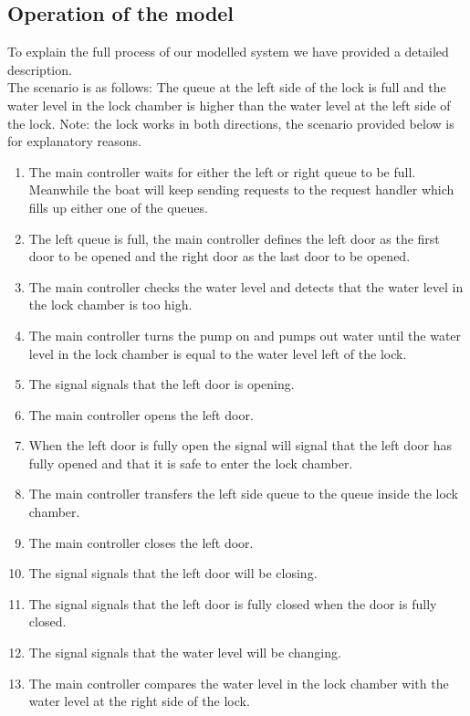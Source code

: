 \documentclass{article}
\begin{document}
    \subsection{Operation of the model}
        To explain the full process of our modelled system we have provided a detailed description. \\
        The scenario is as follows: The queue at the left side of the lock is full and the water level in the lock chamber is higher than the water level at the left side of the lock. Note: the lock works in both directions, the scenario provided below is for explanatory reasons.
        \begin{enumerate}
            \item The main controller waits for either the left or right queue to be full. Meanwhile the boat will keep sending requests to the request handler which fills up either one of the queues.
            \item The left queue is full, the main controller defines the left door as the first door to be opened and the right door as the last door to be opened.
            \item The main controller checks the water level and detects that the water level in the lock chamber is too high.
            \item The main controller turns the pump on and pumps out water until the water level in the lock chamber is equal to the water level left of the lock.
            \item The signal signals that the left door is opening.
            \item The main controller opens the left door. 
            \item When the left door is fully open the signal will signal that the left door has fully opened and that it is safe to enter the lock chamber.
            \item The main controller transfers the left side queue to the queue inside the lock chamber.
            \item The main controller closes the left door.
            \item The signal signals that the left door will be closing.
            \item The signal signals that the left door is fully closed when the door is fully closed.
            \item The signal signals that the water level will be changing.
            \item The main controller compares the water level in the lock chamber with the water level at the right side of the lock.

\end{enumerate}
\end{document}
